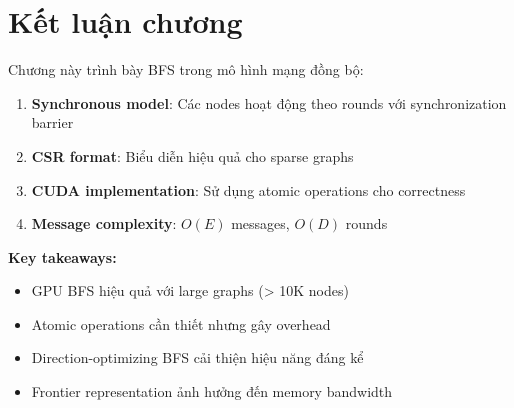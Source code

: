\section{Kết luận chương}

Chương này trình bày BFS trong mô hình mạng đồng bộ:

\begin{enumerate}
    \item \textbf{Synchronous model}: Các nodes hoạt động theo rounds với synchronization barrier
    \item \textbf{CSR format}: Biểu diễn hiệu quả cho sparse graphs
    \item \textbf{CUDA implementation}: Sử dụng atomic operations cho correctness
    \item \textbf{Message complexity}: $O(E)$ messages, $O(D)$ rounds
\end{enumerate}

\textbf{Key takeaways:}
\begin{itemize}
    \item GPU BFS hiệu quả với large graphs (> 10K nodes)
    \item Atomic operations cần thiết nhưng gây overhead
    \item Direction-optimizing BFS cải thiện hiệu năng đáng kể
    \item Frontier representation ảnh hưởng đến memory bandwidth
\end{itemize}
